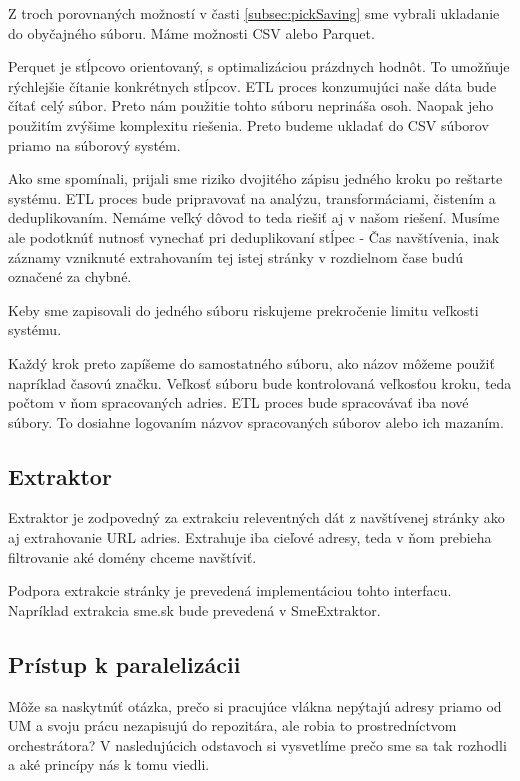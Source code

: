 Z troch porovnaných možností v časti \ref{subsec:pickSaving} sme vybrali ukladanie do obyčajného súboru. Máme možnosti CSV alebo Parquet. 

Perquet je stĺpcovo orientovaný, s optimalizáciou prázdnych hodnôt. To umožňuje rýchlejšie čítanie konkrétnych stĺpcov. ETL proces konzumujúci naše dáta bude čítať celý súbor. Preto nám použitie tohto súboru neprináša osoh. Naopak jeho použitím zvýšime komplexitu riešenia. Preto budeme ukladať do CSV súborov priamo na súborový systém. 

Ako sme spomínali, prijali sme riziko dvojitého zápisu jedného kroku po reštarte systému. ETL proces bude pripravovať na analýzu, transformáciami, čistením a deduplikovaním. Nemáme veľký dôvod to teda riešiť aj v našom riešení. Musíme ale podotknúť nutnosť vynechať pri deduplikovaní stĺpec - Čas navštívenia, inak záznamy vzniknuté extrahovaním tej istej stránky v rozdielnom čase budú označené za chybné. 

Keby sme zapisovali do jedného súboru riskujeme prekročenie limitu veľkosti systému.

Každý krok preto zapíšeme do samostatného súboru, ako názov môžeme použiť napríklad časovú značku. Veľkosť súboru bude kontrolovaná veľkosťou kroku, teda počtom v ňom spracovaných adries. ETL proces bude spracovávať iba nové súbory. To dosiahne logovaním názvov spracovaných súborov alebo ich mazaním. 

\subsection{Extraktor}
Extraktor je zodpovedný za extrakciu releventných dát z navštívenej stránky ako aj extrahovanie URL adries. Extrahuje iba cieľové adresy, teda v ňom prebieha filtrovanie aké domény chceme navštíviť. 

Podpora extrakcie stránky je prevedená implementáciou tohto interfacu. Napríklad extrakcia sme.sk bude prevedená v SmeExtraktor.


\subsection{Prístup k paralelizácii}
Môže sa naskytnúť otázka, prečo si pracujúce vlákna nepýtajú adresy priamo od UM a svoju prácu nezapisujú do repozitára, ale robia to prostredníctvom orchestrátora? V nasledujúcich odstavoch si vysvetlíme prečo sme sa tak rozhodli a aké princípy nás k tomu viedli. 

